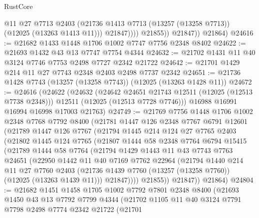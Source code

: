 \begin{lexlean}{RustCore}
\begin{coremodule}
                      @11
                      @27
                      @7713
                      @2403
                      (@21736 @1413 @7713 (@13257 (@13258 @7713)) (@12025 (@13263 @1413 @11)))
                      @21847))))
              @21855))
          @21847))
      @21864)
@24616 := @21682 @1433 @1448 @1706 @1002 @7747 @7756 @2348 @8402
@24622 := @21693 @1432 @43 @13 @7747 @7754 @4344
@24632 := @21702 @1431 @11 @40 @3124 @7746 @7753 @2498 @7727 @2342 @21722
@24642 := @21701 @1429 @214 @11 @27 @7743 @2348 @2403 @2498 @7737 @2342
@24651 := @21736 @1428 @7743 (@13257 (@13258 @7743)) (@12025 (@13263 @1428 @11))
@24672 := @24616
    (@24622
      (@24632
        (@24642 @24651 @21743 @12511 (@12025 (@12513 @7738 @2348)))
        @12511
        (@12025 (@12513 @7728 @7746)))
      @16988
      @16991
      @16994
      @16998
      @17003
      @21763)
@24749 := @21769
    @7756
    @1448
    @1706
    @1002
    @2348
    @7768
    @7792
    @8400
    (@21781
      @1447
      @126
      @2348
      @7767
      @6791
      @12601
      (@21789
        @1447
        @126
        @7767
        (@21794
          @1445
          @214
          @124
          @27
          @7765
          @2403
          (@21802
            @1445
            @124
            @7765
            (@21807
              @1444
              @58
              @2348
              @7764
              @6794
              @15415
              (@21789
                @1444
                @58
                @7764
                (@21794
                  @1429
                  @1443
                  @11
                  @43
                  @7743
                  @7763
                  @24651
                  (@22950
                    @1442
                    @11
                    @40
                    @7169
                    @7762
                    @22964
                    (@21794
                      @1440
                      @214
                      @11
                      @27
                      @7760
                      @2403
                      (@21736 @1439 @7760 (@13257 (@13258 @7760)) (@12025 (@13263 @1439 @11)))
                      @21847))))
              @21855))
          @21847))
      @21864)
@24804 := @21682
    @1451
    @1458
    @1705
    @1002
    @7792
    @7801
    @2348
    @8400
    (@21693
      @1450
      @43
      @13
      @7792
      @7799
      @4344
      (@21702
        @1105
        @11
        @40
        @3124
        @7791
        @7798
        @2498
        @7774
        @2342
        @21722
        (@21701

\end{coremodule}
\end{lexlean}
